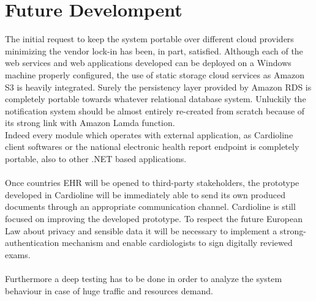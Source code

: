 \section{Future Develompent}
The initial request to keep the system portable over different cloud providers minimizing the vendor lock-in has been, in part, satisfied. Although each of the web services and web applications developed can be deployed on a Windows machine properly configured, the use of static storage cloud services as Amazon S3 is heavily integrated. Surely the persistency layer provided by Amazon RDS is completely portable towards whatever relational database system. Unluckily the notification system should be almost entirely re-created from scratch because of its strong link with Amazon Lamda function.\\
Indeed every module which operates with external application, as Cardioline client softwares or the national electronic health report endpoint is completely portable, also to other .NET based applications.\\ \\
Once countries EHR will be opened to third-party stakeholders, the prototype developed in Cardioline will be immediately able to send its own produced documents through an appropriate communication channel.
Cardioline is still focused on improving the developed prototype. To respect the future European Law about privacy and sensible data it will be necessary to implement a strong-authentication mechanism and enable cardiologists to sign digitally reviewed exams.\\ \\
Furthermore a deep testing has to be done in order to analyze the system behaviour in case of huge traffic and resources demand.\\ \\
